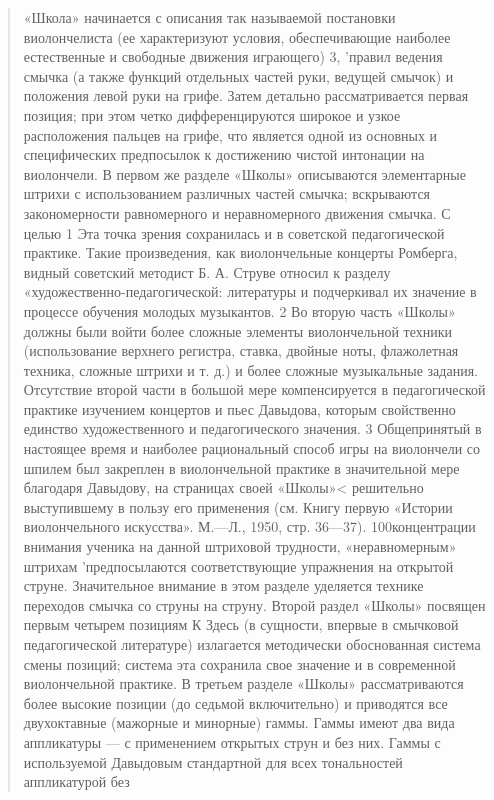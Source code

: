 \documentclass[12pt,a4paper,oneside,titlepage,draft]{extreport}
\begin{document}
		\begin{quotation}
		«Школа» начинается с описания так называемой 
постановки виолончелиста (ее характеризуют условия, 
обеспечивающие наиболее естественные и свободные движения
играющего) 3, 'правил ведения смычка (а также функций
отдельных частей руки, ведущей смычок) и положения левой
руки на грифе. Затем детально рассматривается первая
позиция; при этом четко дифференцируются широкое и узкое
расположения пальцев на грифе, что является одной из
основных и специфических предпосылок к достижению 
чистой интонации на виолончели. В первом же разделе 
«Школы» описываются элементарные штрихи с использованием
различных частей смычка; вскрываются закономерности
равномерного и неравномерного движения смычка. С целью
1 Эта точка зрения сохранилась и в советской педагогической 
практике. Такие произведения, как виолончельные концерты Ромберга, видный
советский методист Б. А. Струве относил к разделу 
«художественно-педагогической: литературы и подчеркивал их значение в процессе 
обучения молодых музыкантов.
2 Во вторую часть «Школы» должны были войти более сложные 
элементы виолончельной техники (использование верхнего регистра, ставка,
двойные ноты, флажолетная техника, сложные штрихи и т. д.) и более
сложные музыкальные задания. Отсутствие второй части в большой мере
компенсируется в педагогической практике изучением концертов и пьес
Давыдова, которым свойственно единство художественного и 
педагогического значения.
3 Общепринятый в настоящее время и наиболее рациональный способ
игры на виолончели со шпилем был закреплен в виолончельной практике
в значительной мере благодаря Давыдову, на страницах своей «Школы»<
решительно выступившему в пользу его применения (см. Книгу первую
«Истории виолончельного искусства». М.—Л., 1950, стр. 36—37).
100концентрации внимания ученика на данной штриховой
трудности, «неравномерным» штрихам 'предпосылаются 
соответствующие упражнения на открытой струне. 
Значительное внимание в этом разделе уделяется технике переходов
смычка со струны на струну.
Второй раздел «Школы» посвящен первым четырем 
позициям К Здесь (в сущности, впервые в смычковой 
педагогической литературе) излагается методически обоснованная
система смены позиций; система эта сохранила свое значение
и в современной виолончельной практике.
В третьем разделе «Школы» рассматриваются более 
высокие позиции (до седьмой включительно) и приводятся все
двухоктавные (мажорные и минорные) гаммы.
Гаммы имеют два вида аппликатуры — с применением
открытых струн и без них. Гаммы с используемой 
Давыдовым стандартной для всех тональностей аппликатурой без

\end{quotation}
\end{document}

